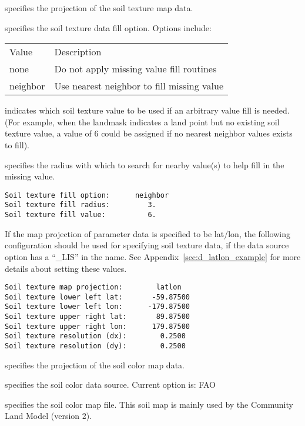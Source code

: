  
  specifies the projection of the
 soil texture map data.

  specifies the soil texture
  data fill option.  Options include:

 \begin{tabular}{ll}
 Value    & Description                                \\
 none     & Do not apply missing value fill routines   \\
 neighbor & Use nearest neighbor to fill missing value \\
 \end{tabular}

  indicates which soil texture 
 value to be used if an arbitrary value fill is needed. 
 (For example, when the landmask indicates a land point but no existing 
 soil texture value, a value of 6 could be assigned if 
 no nearest neighbor values exists to fill).

  specifies the radius with which
 to search for nearby value(s) to help fill in the missing value.
 

 \begin{Verbatim}[frame=single]
Soil texture fill option:      neighbor
Soil texture fill radius:         3.
Soil texture fill value:          6.
 \end{Verbatim}

 
 If the map projection of parameter data is specified to be lat/lon,
 the following configuration should be used for specifying soil
 texture data, if the data source option has a ``\_LIS'' in the name.
 See Appendix~\ref{sec:d_latlon_example} for more details about
 setting these values.
 

 \begin{Verbatim}[frame=single]
Soil texture map projection:        latlon
Soil texture lower left lat:       -59.87500
Soil texture lower left lon:      -179.87500
Soil texture upper right lat:       89.87500
Soil texture upper right lon:      179.87500
Soil texture resolution (dx):        0.2500
Soil texture resolution (dy):        0.2500
 \end{Verbatim}

 
  specifies the projection of the
 soil color map data.

  specifies the soil color data source.
  Current option is:  FAO

  specifies the soil color map file.
  This soil map is mainly used by the Community Land Model (version 2).

